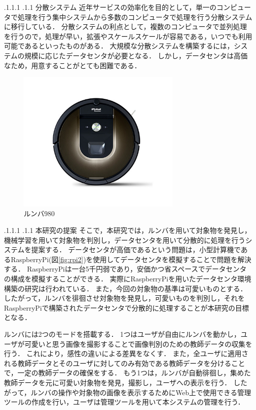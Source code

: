 \documentclass[a4paper, twocolumn]{jarticle}
\makeatletter
\def\section{\@startsection{section}{1}{\z@}%
 {.1\Cvs \@plus.1\Cdp \@minus.1\Cdp}%
 {.1\Cvs \@plus.1\Cdp}%
 {\normalfont\normalsize\bfseries}}
\def\subsection{\@startsection{subsection}{1}{\z@}%
 {.1\Cvs \@plus.1\Cdp \@minus.1\Cdp}%
 {.1\Cvs \@plus.1\Cdp}%
 {\normalfont\normalsize\bfseries}}
\makeatother
\begin{document}
\subsection{分散システム}
近年サービスの効率化を目的として，単一のコンピュータで処理を行う集中システムから多数のコンピュータで処理を行う分散システムに移行している．
分散システムの利点として，複数のコンピュータで並列処理を行うので，処理が早い，拡張やスケールスケールが容易である，いつでも利用可能であるといったものがある．
大規模な分散システムを構築するには，システムの規模に応じたデータセンタが必要となる．
しかし，データセンタは高価なため，用意することがとても困難である．

\begin{figure}[tb]
	\centering
	\includegraphics[width=8.0cm]{figure/roomba.jpg}
	\caption{ルンバ980}
	\label{fig:roomba}
\end{figure}

\section{本研究の提案}\label{subsec:a}
そこで，本研究では，ルンバを用いて対象物を発見し，機械学習を用いて対象物を判別し，データセンタを用いて分散的に処理を行うシステムを提案する．
データセンタが高価であるという問題は，小型計算機であるRaspberryPi(図\ref{fig:rpi2})を使用してデータセンタを模擬することで問題を解決する．
RaspberryPiは一台5千円弱であり，安価かつ省スペースでデータセンタの構成を模擬することができる．
実際にRaspberryPiを用いたデータセンタ環境構築の研究は行われている\cite{thesis3}．
また，今回の対象物の基準は可愛いものとする．
したがって，ルンバを徘徊させ対象物を発見し，可愛いものを判別し，それをRaspberryPiで構築されたデータセンタで分散的に処理することが本研究の目標となる．

ルンバには2つのモードを搭載する．
1つはユーザが自由にルンバを動かし，ユーザが可愛いと思う画像を撮影することで画像判別のための教師データの収集を行う．
これにより，感性の違いによる差異をなくす．
また，全ユーザに適用される教師データとそのユーザに対してのみ有効である教師データを分けることで，一定の教師データの確保をする．
もう1つは，ルンバが自動徘徊し，集めた教師データを元に可愛い対象物を発見，撮影し，ユーザへの表示を行う．
したがって，ルンバの操作や対象物の画像を表示するためにWeb上で使用できる管理ツールの作成を行い，ユーザは管理ツールを用いて本システムの管理を行う．
\end{document}
